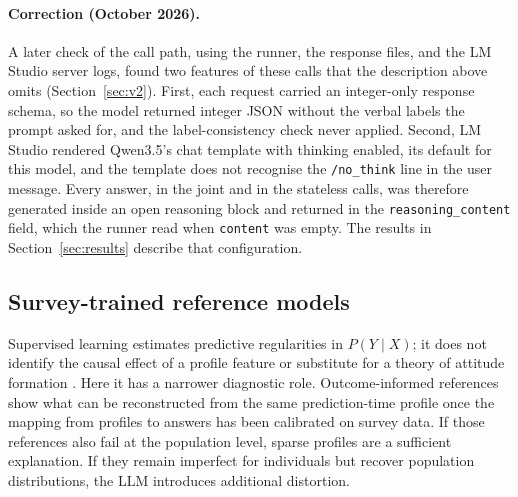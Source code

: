 \documentclass[11pt]{article}
\begin{document}
\paragraph{Correction (October 2026).} A later check of the call path, using the runner, the response files, and the LM Studio server logs, found two features of these calls that the description above omits (Section~\ref{sec:v2}). First, each request carried an integer-only response schema, so the model returned integer JSON without the verbal labels the prompt asked for, and the label-consistency check never applied. Second, LM Studio rendered Qwen3.5's chat template with thinking enabled, its default for this model, and the template does not recognise the \texttt{/no\_think} line in the user message. Every answer, in the joint and in the stateless calls, was therefore generated inside an open reasoning block and returned in the \texttt{reasoning\_content} field, which the runner read when \texttt{content} was empty. The results in Section~\ref{sec:results} describe that configuration.

\subsection{Survey-trained reference models}

Supervised learning estimates predictive regularities in $P(Y\mid X)$; it does not identify the causal effect of a profile feature or substitute for a theory of attitude formation \citep{mullainathan2017machine,grimmer2021agnostic}. Here it has a narrower diagnostic role. Outcome-informed references show what can be reconstructed from the same prediction-time profile once the mapping from profiles to answers has been calibrated on survey data. If those references also fail at the population level, sparse profiles are a sufficient explanation. If they remain imperfect for individuals but recover population distributions, the LLM introduces additional distortion.
\end{document}
